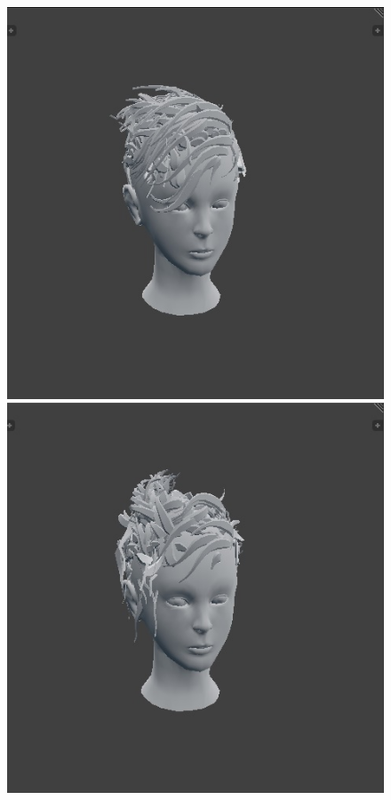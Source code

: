 \documentclass[ %
author={Dillon Keith Diep},
supervisor={Dr. Carl Henrik Ek},
degree={MEng},
title={ART-CG Hair:},
subtitle={Assisted Real-time Content Generation of Stylised Virtual Hair},
type={Research},
year={2017} ]{dissertation}
\begin{document}
\begin{figure}[!h]
		\includegraphics[scale=0.25]{images/outputMesh5}
		\includegraphics[scale=0.25]{images/outputMesh6}

\end{figure}
\end{document}
